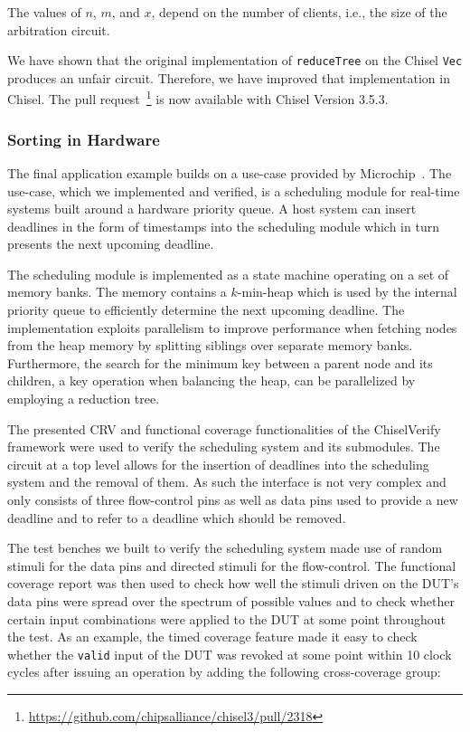 \documentclass[conference]{IEEEtran}
\newcommand{\code}[1]{{\small{\texttt{#1}}}}
\newcommand{\martin}[1]{{\color{blue} Martin: #1}}
\begin{document}
The values of $n$, $m$, and $x$, depend on the number of clients, i.e., the size of the arbitration
circuit.

We have shown that the original implementation of \code{reduceTree} on the Chisel \code{Vec}
produces an unfair circuit. Therefore, we have improved that implementation in Chisel.
The pull request~\footnote{\url{https://github.com/chipsalliance/chisel3/pull/2318}} is now available
with Chisel Version 3.5.3.

\subsubsection{Sorting in Hardware}


The final application example builds on a use-case provided
by Microchip~\cite{microchip}. The use-case, which we implemented and verified, is a scheduling module for real-time systems built around a hardware priority queue.
A host system can insert deadlines in the form of timestamps into the scheduling module which in turn presents the next upcoming deadline.

The scheduling module is implemented as a state machine 
operating on a set of memory banks. The memory contains a $k$-min-heap which is used by the internal priority queue to efficiently determine the next upcoming deadline. The implementation exploits parallelism to improve performance when fetching nodes from the heap memory by splitting siblings over separate memory banks. Furthermore, the search for the minimum key between a parent node and its children, a key operation when balancing the heap, can be parallelized by employing a reduction tree.

The presented CRV and functional coverage functionalities of the ChiselVerify framework were used to verify the scheduling system and its submodules. 
The circuit at a top level allows for the insertion of deadlines into the scheduling system and the removal of them. As such the interface is not very complex and only consists of three flow-control pins as well as data pins used to provide a new deadline and to refer to a deadline which should be removed. 


The test benches we built to verify the scheduling system made use of random stimuli for the data pins and directed stimuli for the flow-control.
The functional coverage report was then used to check how well the stimuli driven on the DUT's data pins were spread over the spectrum of possible values and to check whether certain input combinations were applied to the DUT at some point throughout the test. 
As an example, the timed coverage feature made it easy to check whether the \texttt{valid} input of the DUT was revoked at some point within 10 clock cycles after issuing an operation by adding the following cross-coverage group:
\end{document}
